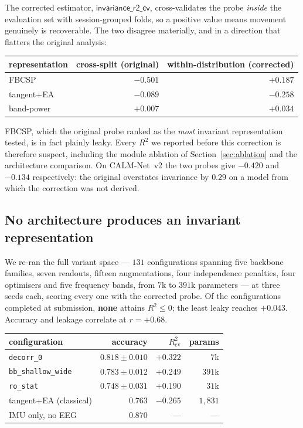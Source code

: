 \documentclass[journal]{IEEEtran}
\begin{document}
The corrected estimator, $\textsf{invariance\_r2\_cv}$, cross-validates the probe
\emph{inside} the evaluation set with session-grouped folds, so a positive value means
movement genuinely is recoverable. The two disagree materially, and in a direction that
flatters the original analysis:

\begin{center}
\begin{tabular}{lrr}
\toprule
representation & cross-split (original) & within-distribution (corrected) \\
\midrule
FBCSP      & $-0.501$ & $+0.187$ \\
tangent+EA & $-0.089$ & $-0.258$ \\
band-power & $+0.007$ & $+0.034$ \\
\bottomrule
\end{tabular}
\end{center}

FBCSP, which the original probe ranked as the \emph{most} invariant representation
tested, is in fact plainly leaky. Every $R^2$ we reported before this correction is
therefore suspect, including the module ablation of Section~\ref{sec:ablation} and the
architecture comparison. On CALM-Net~v2 the two probes give $-0.420$ and $-0.134$
respectively: the original overstates invariance by $0.29$ on a model from which the
correction was not derived.

\subsection{No architecture produces an invariant representation}

We re-ran the full variant space --- $131$ configurations spanning five backbone
families, seven readouts, fifteen augmentations, four independence penalties, four
optimisers and five frequency bands, from $7$k to $391$k parameters --- at three seeds
each, scoring every one with the corrected probe. Of the configurations completed at
submission, \textbf{none} attains $R^2 \le 0$; the least leaky reaches $+0.043$.
Accuracy and leakage correlate at $r = +0.68$.

\begin{center}
\begin{tabular}{lrrr}
\toprule
configuration & accuracy & $R^2_{\mathrm{cv}}$ & params \\
\midrule
\texttt{decorr\_0}        & $0.818 \pm 0.010$ & $+0.322$ & $7$k \\
\texttt{bb\_shallow\_wide}& $0.783 \pm 0.012$ & $+0.249$ & $391$k \\
\texttt{ro\_stat}         & $0.748 \pm 0.031$ & $+0.190$ & $31$k \\
\midrule
tangent+EA (classical)    & $0.763$           & $-0.265$ & $1{,}831$ \\
IMU only, no EEG          & $0.870$           & ---      & --- \\
\bottomrule
\end{tabular}
\end{center}
\end{document}

